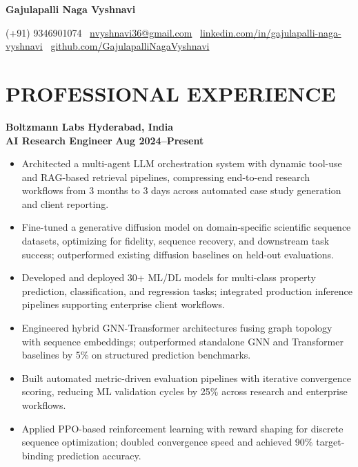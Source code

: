\documentclass[a4paper,10pt]{article}
\begin{document}
\begin{center}
    {\fontsize{16pt}{16pt}\selectfont \textbf{Gajulapalli Naga Vyshnavi}}
\end{center}
\begin{center}
    \vspace{-5pt}
    (+91) 9346901074 \textbar\, \href{mailto:nvyshnavi36@gmail.com}{nvyshnavi36@gmail.com} \textbar\,
    \href{https://www.linkedin.com/in/gajulapalli-naga-vyshnavi-646931242/}{linkedin.com/in/gajulapalli-naga-vyshnavi} \textbar\,
    \href{https://github.com/GajulapalliNagaVyshnavi}{github.com/GajulapalliNagaVyshnavi}
\end{center}

\vspace{-10pt}

\section{\textbf{PROFESSIONAL EXPERIENCE}}
\vspace{0pt}

\noindent\textbf{Boltzmann Labs} \hfill \textbf{Hyderabad, India} \\
\textbf{AI Research Engineer} \hfill \textbf{Aug 2024--Present}
\begin{itemize}
    \vspace{-5pt}
    \item Architected a multi-agent LLM orchestration system with dynamic tool-use and RAG-based retrieval pipelines, compressing end-to-end research workflows from 3 months to 3 days across automated case study generation and client reporting. \vspace{-7pt}
    \item Fine-tuned a generative diffusion model on domain-specific scientific sequence datasets, optimizing for fidelity, sequence recovery, and downstream task success; outperformed existing diffusion baselines on held-out evaluations. \vspace{-7pt}
    \item Developed and deployed 30+ ML/DL models for multi-class property prediction, classification, and regression tasks; integrated production inference pipelines supporting enterprise client workflows. \vspace{-7pt}
    \item Engineered hybrid GNN-Transformer architectures fusing graph topology with sequence embeddings; outperformed standalone GNN and Transformer baselines by 5\% on structured prediction benchmarks. \vspace{-7pt}
    \item Built automated metric-driven evaluation pipelines with iterative convergence scoring, reducing ML validation cycles by 25\% across research and enterprise workflows. \vspace{-7pt}
    \item Applied PPO-based reinforcement learning with reward shaping for discrete sequence optimization; doubled convergence speed and achieved 90\% target-binding prediction accuracy. \vspace{-7pt}
\end{itemize}
\end{document}
